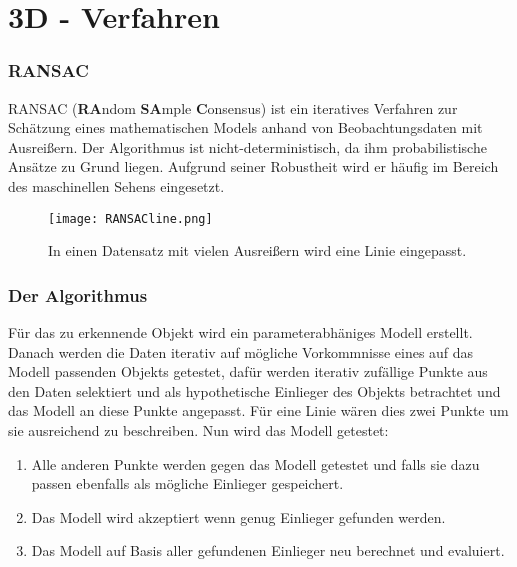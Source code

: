 
\chapter{3D - Verfahren}
\label{chap:3d}
\subsection{RANSAC}
RANSAC (\textbf{RA}ndom \textbf{SA}mple \textbf{C}onsensus) \cite{Fischler1981} ist ein iteratives Verfahren zur Schätzung eines mathematischen Models anhand von Beobachtungsdaten mit Ausreißern. Der Algorithmus ist nicht-deterministisch, da ihm probabilistische Ansätze zu Grund liegen. Aufgrund seiner Robustheit wird er häufig im Bereich des maschinellen Sehens eingesetzt. 

\begin{figure}[H]
  \begin{center}
    \texttt{[image: RANSACline.png]}
    \caption{In einen Datensatz mit vielen Ausreißern wird eine Linie eingepasst.}
    \label{fig:ransac1}
  \end{center}
\end{figure}

\subsection{Der Algorithmus}
 Für das zu erkennende Objekt wird ein parameterabhäniges Modell erstellt. Danach werden die Daten iterativ auf mögliche Vorkommnisse eines auf das Modell passenden Objekts getestet, dafür werden iterativ zufällige Punkte aus den Daten selektiert und als hypothetische Einlieger des Objekts betrachtet und das Modell an diese Punkte angepasst. Für eine Linie wären dies zwei Punkte um sie ausreichend zu beschreiben. Nun wird das Modell getestet:

\begin{enumerate}
\item Alle anderen Punkte werden gegen das Modell getestet und falls sie dazu passen ebenfalls als mögliche Einlieger gespeichert.
\item Das Modell wird akzeptiert wenn genug Einlieger gefunden werden.
\item Das Modell auf Basis aller gefundenen Einlieger neu berechnet und evaluiert.
\end{enumerate}

